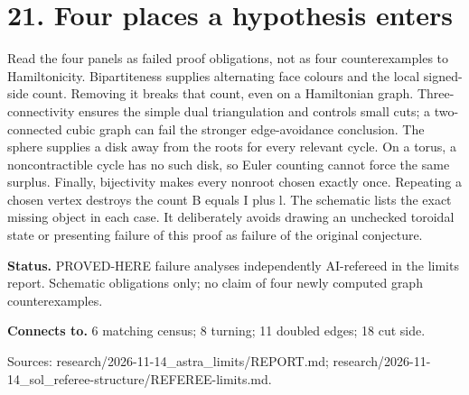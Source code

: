 \documentclass[10pt,a4paper]{amsart}
\begin{document}
\section*{21. Four places a hypothesis enters}
\begin{center}\begin{minipage}{.86\textwidth}\centering
{}
\end{minipage}\end{center}
Read the four panels as failed proof obligations, not as four counterexamples to Hamiltonicity. Bipartiteness supplies alternating face colours and the local signed-side count. Removing it breaks that count, even on a Hamiltonian graph. Three-connectivity ensures the simple dual triangulation and controls small cuts; a two-connected cubic graph can fail the stronger edge-avoidance conclusion. The sphere supplies a disk away from the roots for every relevant cycle. On a torus, a noncontractible cycle has no such disk, so Euler counting cannot force the same surplus. Finally, bijectivity makes every nonroot chosen exactly once. Repeating a chosen vertex destroys the count B equals I plus l. The schematic lists the exact missing object in each case. It deliberately avoids drawing an unchecked toroidal state or presenting failure of this proof as failure of the original conjecture.

\textbf{Status.} PROVED-HERE failure analyses independently AI-refereed in the limits report. Schematic obligations only; no claim of four newly computed graph counterexamples.

\textbf{Connects to.} 6 matching census; 8 turning; 11 doubled edges; 18 cut side.

{\footnotesize\raggedright Sources: research/\allowbreak{}2026-11-14\_astra\_limits/\allowbreak{}REPORT.md;\allowbreak{} research/\allowbreak{}2026-11-14\_sol\_referee-structure/\allowbreak{}REFEREE-limits.md.\par}
\end{document}

